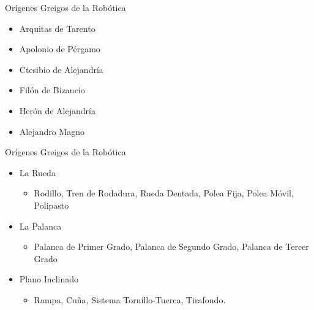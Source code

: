 
\begin{frame}[fragile]{Orígenes Greigos de la Robótica}
\vspace{8px}
\pause
{}
\begin{block}
	\begin{itemize}
		\item Arquitas de Tarento
		\pause
		\item Apolonio de Pérgamo
		\pause
		\item Ctesibio de Alejandría
		\pause
		\item Filón de Bizancio
		\pause
		\item Herón de Alejandría
		\pause
		\item Alejandro Magno
	\end{itemize}
\end{block}
\end{frame}


\begin{frame}[fragile]{Orígenes Greigos de la Robótica}
\vspace{8px}
\pause
{}
\begin{block}
	\begin{itemize}
		\item La Rueda
		\pause
			\begin{itemize}
				\item Rodillo, Tren de Rodadura, Rueda Dentada, Polea Fija, Polea Móvil, Polipasto
				\pause
			\end{itemize}
		\item La Palanca
		\pause
			\begin{itemize}
				\item Palanca de Primer Grado, Palanca de Segundo Grado, Palanca de Tercer Grado
				\pause
			\end{itemize}
		\item Plano Inclinado
		\pause
			\begin{itemize}
				\item Rampa, Cuña, Sistema Tornillo-Tuerca, Tirafondo.
			\end{itemize}
	\end{itemize}
\end{block}
\end{frame}

